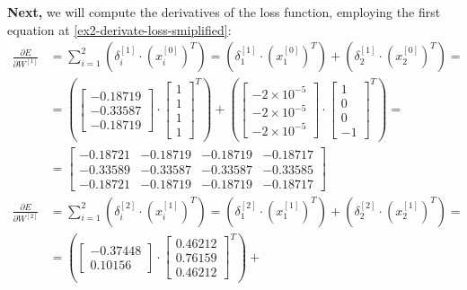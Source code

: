 \documentclass[12pt]{article}
\begin{document}
\begin{enumerate}[leftmargin=\labelsep]
        \textbf{Next,} we will compute the derivatives of the loss function, employing the first equation at \eqref{ex2-derivate-loss-smiplified}:
        \begingroup
        \allowdisplaybreaks
          \begin{align*}
            \frac{\partial E}{\partial W^{[1]}} &= \sum_{i=1}^{2} \left(\delta^{[1]}_i \cdot \left(x^{[0]}_i\right)^{T}\right)
             = \left(\delta^{[1]}_1 \cdot \left(x^{[0]}_1\right)^{T}\right) + \left(\delta^{[1]}_2 \cdot \left(x^{[0]}_2\right)^{T}\right) = \\
             &= \left(\begin{bmatrix} -0.18719 \\ -0.33587 \\ -0.18719 \end{bmatrix} \cdot \begin{bmatrix} 1 \\ 1 \\ 1 \\ 1\end{bmatrix}^{T}\right) +
                 \left(\begin{bmatrix} -2 \times 10^{-5} \\ -2 \times 10^{-5} \\ -2 \times 10^{-5}  \end{bmatrix} \cdot \begin{bmatrix} 1 \\ 0 \\ 0 \\ -1\end{bmatrix}^{T}\right) = \\
             &= \begin{bmatrix} -0.18721 & -0.18719 & -0.18719 & -0.18717\\ -0.33589 & -0.33587 & -0.33587 & -0.33585 \\ -0.18721 & -0.18719 & -0.18719 & -0.18717\end{bmatrix} \\
            \frac{\partial E}{\partial W^{[2]}} &= \sum_{i=1}^{2} \left(\delta^{[2]}_i \cdot \left(x^{[1]}_i\right)^{T}\right)
             = \left(\delta^{[2]}_1 \cdot \left(x^{[1]}_1\right)^{T}\right) + \left(\delta^{[2]}_2 \cdot \left(x^{[1]}_2\right)^{T}\right) = \\
             &= \left(\begin{bmatrix} -0.37448 \\ 0.10156 \end{bmatrix} \cdot \begin{bmatrix} 0.46212 \\ 0.76159 \\ 0.46212\end{bmatrix}^{T}\right) +

\end{align*}
\end{enumerate}
\end{document}
